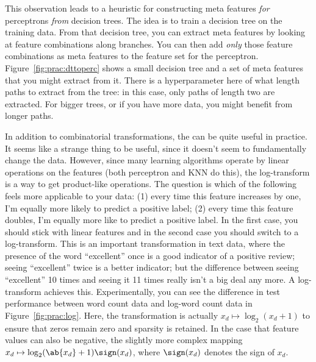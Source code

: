 
This observation leads to a heuristic for constructing meta features
\emph{for} perceptrons \emph{from} decision trees.  The idea is to
train a decision tree on the training data.  From that decision tree,
you can extract meta features by looking at feature combinations along
branches.  You can then add \emph{only} those feature combinations as
meta features to the feature set for the perceptron.
Figure~\ref{fig:prac:dttoperc} shows a small decision tree and a set
of meta features that you might extract from it.  There is a
hyperparameter here of what length paths to extract from the tree: in
this case, only paths of length two are extracted.  For bigger trees,
or if you have more data, you might benefit from longer paths.


In addition to combinatorial transformations, the  can be quite useful in practice.  It seems like a
strange thing to be useful, since it doesn't seem to fundamentally
change the data.  However, since many learning algorithms operate by
linear operations on the features (both perceptron and KNN do this),
the log-transform is a way to get product-like operations.  The
question is which of the following feels more applicable to your data:
(1) every time this feature increases by one, I'm equally more likely
to predict a positive label; (2) every time this feature doubles, I'm
equally more like to predict a positive label.  In the first case, you
should stick with linear features and in the second case you should
switch to a log-transform.  This is an important transformation in
text data, where the presence of the word ``excellent'' once is a good
indicator of a positive review; seeing ``excellent'' twice is a better
indicator; but the difference between seeing ``excellent'' 10 times
and seeing it 11 times really isn't a big deal any more.  A
log-transform achieves this.  Experimentally, you can see the
difference in test performance between word count data and log-word
count data in Figure~\ref{fig:prac:log}.  Here, the transformation is
actually $x_d \mapsto \log_2(x_d + 1)$ to ensure that zeros remain
zero and sparsity is retained. In the case that feature values can also be negative, the slightly more complex mapping $x_d \mapsto \log_2(\ab{x_d}+1) \sign(x_d)$, where $\sign(x_d)$ denotes the sign of $x_d$.

